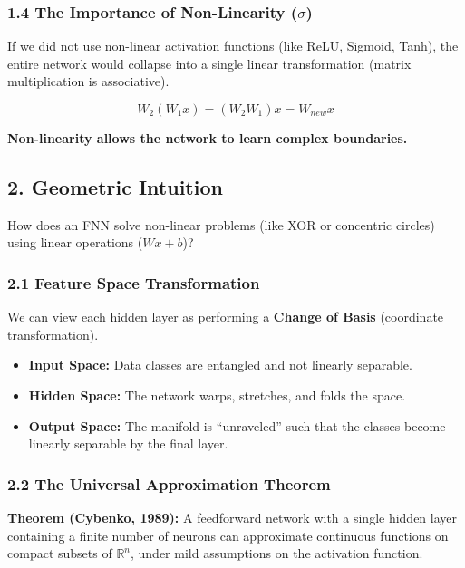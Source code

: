 \documentclass[
  italian,
  11pt,
]{article}
\begin{document}
\subsubsection{\texorpdfstring{1.4 The Importance of Non-Linearity
(\(\sigma\))}{1.4 The Importance of Non-Linearity (\textbackslash sigma)}}\label{the-importance-of-non-linearity-sigma}

If we did not use non-linear activation functions (like ReLU, Sigmoid,
Tanh), the entire network would collapse into a single linear
transformation (matrix multiplication is associative).

\[W_2(W_1 x) = (W_2 W_1)x = W_{new} x\]

\textbf{Non-linearity allows the network to learn complex boundaries.}

\subsection{2. Geometric Intuition}\label{geometric-intuition}

How does an FNN solve non-linear problems (like XOR or concentric
circles) using linear operations (\(Wx+b\))?

\subsubsection{2.1 Feature Space
Transformation}\label{feature-space-transformation}

We can view each hidden layer as performing a \textbf{Change of Basis}
(coordinate transformation).

\begin{itemize}
\item
  \textbf{Input Space:} Data classes are entangled and not linearly
  separable.
\item
  \textbf{Hidden Space:} The network warps, stretches, and folds the
  space.
\item
  \textbf{Output Space:} The manifold is ``unraveled'' such that the
  classes become linearly separable by the final layer.
\end{itemize}

\subsubsection{2.2 The Universal Approximation
Theorem}\label{the-universal-approximation-theorem}

\textbf{Theorem (Cybenko, 1989):} A feedforward network with a single
hidden layer containing a finite number of neurons can approximate
continuous functions on compact subsets of \(\mathbb{R}^n\), under mild
assumptions on the activation function.
\end{document}
